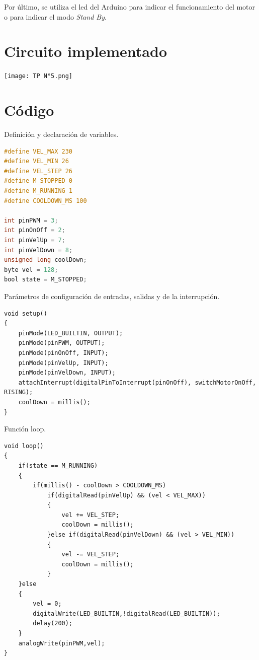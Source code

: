 \documentclass[a4paper, 12pt]{article}
\begin{document}
Por último, se utiliza el led del Arduino para indicar el funcionamiento del motor o para indicar el modo \textit{Stand By}.

\section{Circuito implementado}

\begin{center}
	\texttt{[image: TP N°5.png]}
\end{center}

\section{Código}

Definición y declaración de variables.

\begin{lstlisting}[language=C]
#define VEL_MAX 230
#define VEL_MIN 26
#define VEL_STEP 26
#define M_STOPPED 0
#define M_RUNNING 1
#define COOLDOWN_MS 100

int pinPWM = 3;
int pinOnOff = 2;
int pinVelUp = 7;
int pinVelDown = 8;
unsigned long coolDown;
byte vel = 128;
bool state = M_STOPPED;
\end{lstlisting}

Parámetros de configuración de entradas, salidas y de la interrupción.

\begin{lstlisting}
void setup()
{
    pinMode(LED_BUILTIN, OUTPUT);
    pinMode(pinPWM, OUTPUT);
    pinMode(pinOnOff, INPUT);
    pinMode(pinVelUp, INPUT);
    pinMode(pinVelDown, INPUT);
    attachInterrupt(digitalPinToInterrupt(pinOnOff), switchMotorOnOff, RISING);
    coolDown = millis();
}
\end{lstlisting}
 
Función loop.

\begin{lstlisting}
void loop()
{
    if(state == M_RUNNING)
    {
        if(millis() - coolDown > COOLDOWN_MS)
            if(digitalRead(pinVelUp) && (vel < VEL_MAX))
            {
                vel += VEL_STEP;
                coolDown = millis();
            }else if(digitalRead(pinVelDown) && (vel > VEL_MIN))
            {
                vel -= VEL_STEP;
                coolDown = millis();
            }
    }else
    {
        vel = 0;
        digitalWrite(LED_BUILTIN,!digitalRead(LED_BUILTIN));
        delay(200);
    }
    analogWrite(pinPWM,vel);
}
\end{lstlisting}
\end{document}
